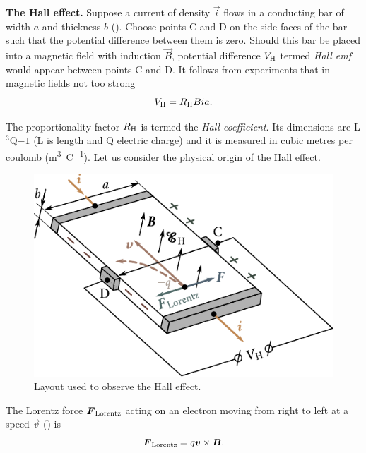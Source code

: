 \textbf{The Hall effect.} Suppose a current of density $\vec{i}$ flows in a conducting bar of width $a$ and thickness $b$ (). Choose points C and D on the side faces of the bar such that the potential difference between them is zero. Should this bar be placed into a magnetic field with induction $\vec{B}$, potential difference $V_{\text{H}}$ termed \textit{Hall emf} would appear
between points C and D. It follows from experiments that in magnetic fields not too strong
\begin{equation}\label{eq:9_32}
    V_{\text{H}} = R_{\text{H}} B i a.
\end{equation}

\noindent
The proportionality factor $R_{\text{H}}$ is termed the \textit{Hall coefficient}. Its dimensions are L$^3$Q${-1}$ (L is length and Q electric charge) and it is measured in cubic metres per coulomb (\si{\metre\cubed\per\coulomb}). Let us consider the physical origin of the Hall effect.

\begin{figure}[t]
	\begin{center}
		\includegraphics[scale=1]{figures/ch_09/fig_9_5.pdf}
		\caption[]{Layout used to observe the Hall effect.}
		\label{fig:9_5}
	\end{center}
	\vspace{-0.8cm}
\end{figure}

The Lorentz force $\boldsymbol{F}_{\text{Lorentz}}$ acting on an electron moving from right to left at a speed $\vec{v}$ () is
\begin{equation*}
    \boldsymbol{F}_{\text{Lorentz}} = q \boldsymbol{v}\times\boldsymbol{B}.
\end{equation*}

